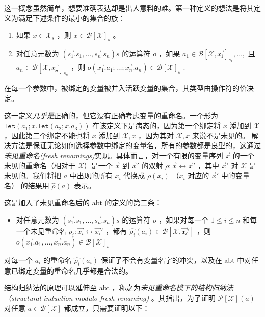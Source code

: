 这一概念虽然简单，想要准确表达却是出人意料的难。第一种定义的想法是将其定义为满足下述条件的最小的集合的族：

\begin{enumerate}
\def\labelenumi{\arabic{enumi}.}
\item
  如果 \(x\in \mathcal{X}_s\) ，则 \(x \in \mathcal{B[X]}_s\) 。
\item
  对任意元数为 \((\vec{s_1}.s_1,\dots,\vec{s_n}.s_n)s\) 的运算符 \(o\)
  ，如果 \(a_1\in \mathcal{B[X,\vec{x_1}]}_{s_1},\dots,\) 且
  \(a_n\in \mathcal{B[X,\vec{x_n}]}_{s_n}\) ，则
  \(o(\vec{x_1}.a_1;\dots;\vec{x_n}.a_n)\in \mathcal{B[X]}_s\) .
\end{enumerate}

在每一个参数中，被绑定的变量被并入活跃变量的集合，其类型由操作符的价决定。

这一定义\emph{几乎是}正确的，但它没有正确考虑变量的重命名。一个形为
\(\texttt{let}(a_1;x.\texttt{let}(a_2;x.a_3))\)
在该定义下是病态的，因为第一个绑定将 \(x\) 添加到 \(\mathcal{X}\)
，因此第二个绑定不能也将 \(x\) 添加到 \(\mathcal{X},x\) ，因为其对
\(\mathcal{X},x\) 来说不是未见的。
解决方法是保证无论如何选择参数中绑定的变量名，所有的参数都是良型的，这通过\emph{未见重命名(fresh
renamings)}实现。具体而言，对一个有限的变量序列 \(\vec{x}\)
的一个未见的重命名（相对于 \(\mathcal{X}\)）是一个 \(\vec{x}\) 到
\(\vec{x}'\) 的双射 \(\rho : \vec{x} \leftrightarrow \vec{x}'\) ，其中
\(\vec{x}'\) 对 \(\mathcal{X}\) 是未见的。我们将把 \(a\) 中出现的所有
\(x_i\) 代换成 \(\rho(x_i)\) （\(x_i\) 对应的 \(\vec{x}'\) 中的变量名）
的结果用 \(\hat{\rho}(a)\) 表示。

这是加入了未见重命名后的 abt 的定义的第二条：

\begin{itemize}
\item
  对任意元数为 \((\vec{s_1}.s_1,\dots,\vec{s_n}.s_n)s\) 的运算符 \(o\)
  ，如果对每一个 \(1 \leq i \leq n\) 和每一个未见重命名
  \(\rho_i:\vec{x_i}\leftrightarrow \vec{x_i}'\) ，都有
  \(\hat{\rho_i}(a_i)\in \mathcal{B[X,\vec{x_i}']}\) ，则
  \(o(\vec{x_1}.a_1,\dots,\vec{x_n}.a_n)\in \mathcal{B[X]}_s\)
\end{itemize}

对每一个 \(a_i\) 的重命名 \(\hat{\rho_i}(a_i)\)
保证了不会有变量名字的冲突，以及在 abt
中对任意已绑定变量的重命名几乎都是合法的。

结构归纳法的原理可以延伸至 abt
，称之为\emph{未见重命名模下的结构归纳法（structural induction modulo
fresh renaming)} 。其指出，为了证明 \(\mathcal{P[X]}(a)\) 对任意
\(a\in \mathcal{B[X]}\) 都成立，只需要证明以下：

